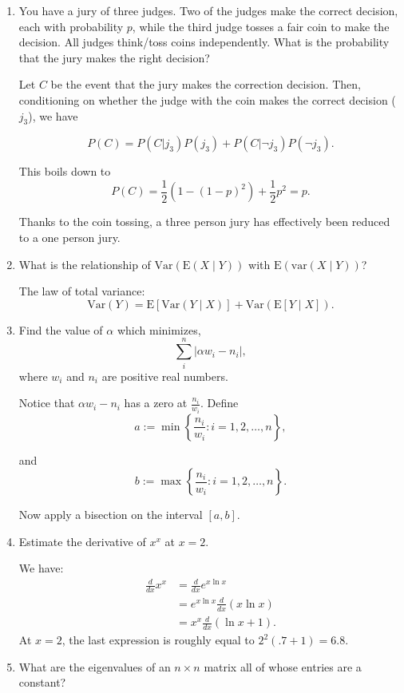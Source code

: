 \documentclass{amsart}
\theoremstyle{plain}
\numberwithin{equation}{section}
\begin{document}
\begin{enumerate}
\item You have a jury of three judges. Two of the judges
make the correct decision, each with probability $p$, while
the third judge tosses a fair coin to make the decision. 
All judges think/toss coins independently. What is the 
probability that the jury makes the right decision?

Let $C$ be the event that the jury makes the correction decision. 
Then, conditioning on whether the judge with the coin
makes the correct decision  ($j_3$), we have

$$P(C) = P(C|j_3) P(j_3)+P(C|\neg j_3)P(\neg j_3).$$

This boils down to
$$P(C) = \frac{1}{2}\left(1-(1-p)^2\right) + \frac{1}{2} p^2 = p.$$

Thanks to the coin tossing, a three person jury has 
effectively been reduced to a one person jury. 


\item What is the relationship of $\mathrm{Var}(\mathrm{E}(X\mid Y))$ with
$\mathrm{E}(\mathrm{var}(X\mid Y))$?

The law of total variance:
$$\mathrm{Var}(Y)=\mathrm{E}[\mathrm{Var}(Y\mid X)]+
\mathrm{Var}(\mathrm{E}[Y\mid X]).$$

\item Find the value of $\alpha$ which minimizes,
\begin{equation*}
\sum_{i}^{n} \left|\alpha w_i - n_i\right|,
\end{equation*}
where $w_i$ and $n_i$ are positive real numbers.

Notice that $\alpha w_i - n_i$ has a zero at $\frac{n_i}{w_i}$. 
Define 
\begin{equation*}
a := \min \left\{ \frac{n_i}{w_i}: i = 1, 2, \ldots, n \right\},
\end{equation*}

and 
$$b := \max \left\{ \frac{n_i}{w_i}: i = 1, 2, \ldots, n \right\}.$$

Now apply a bisection on the interval $[a, b]$.

\item Estimate the derivative of $x^x$ at $x=2$.

We have:
\begin{align*}
\frac{d}{dx}x^x &= \frac{d}{dx} e^{ x\ln x} \\
&= e^{x \ln x }\frac{d}{dx}(x \ln x)\\
&= x^{x}\frac{d}{dx}(\ln x + 1 ).
\end{align*}
At $x=2$, the last expression is roughly equal to
$2^2(.7 + 1 )=6.8$.
\item What are the eigenvalues of an $n \times n$
 matrix all of whose entries are a constant?


\end{enumerate}
\end{document}
